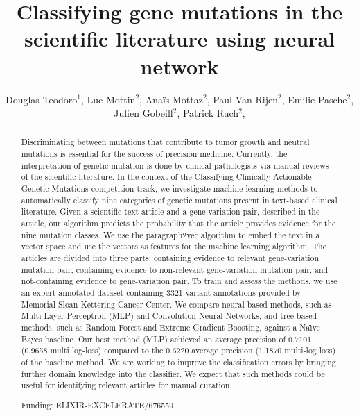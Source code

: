 \documentclass[twoside]{article}
\title{\vspace{-15mm}\fontsize{24pt}{10pt}\selectfont\textbf{ Classifying gene mutations in the scientific literature using neural network }} %
\author{ Douglas Teodoro$^{1}$, Luc Mottin$^{2}$, Anaïs Mottaz$^{2}$, Paul Van Rijen$^{2}$, Emilie Pasche$^{2}$, Julien Gobeill$^{2}$, Patrick Ruch$^{2}$, }
\affil{ 1 SIB Swiss Institute of Bioinformatics

2 HES-SO/HEG Geneva

 }
\date{}
\begin{document}
  
  
  \maketitle %
  
  
  \thispagestyle{fancy} %
  
  
  \begin{abstract}
  Discriminating between mutations that contribute to tumor growth and neutral mutations is essential for the success of precision medicine. Currently, the interpretation of genetic mutation is done by clinical pathologists via manual reviews of the scientific literature. In the context of the Classifying Clinically Actionable Genetic Mutations competition track, we investigate machine learning methods to automatically classify nine categories of genetic mutations present in text-based clinical literature. Given a scientific text article and a gene-variation pair, described in the article, our algorithm predicts the probability that the article provides evidence for the nine mutation classes. We use the paragraph2vec algorithm to embed the text in a vector space and use the vectors as features for the machine learning algorithm. The articles are divided into three parts: containing evidence to relevant gene-variation mutation pair, containing evidence to non-relevant gene-variation mutation pair, and not-containing evidence to gene-variation pair. To train and assess the methods, we use an expert-annotated dataset containing 3321 variant annotations provided by Memorial Sloan Kettering Cancer Center. We compare neural-based methods, such as Multi-Layer Perceptron (MLP) and Convolution Neural Networks, and tree-based methods, such as Random Forest and Extreme Gradient Boosting, against a Na\"{\i}ve Bayes baseline. Our best method (MLP) achieved an average precision of 0.7101 (0.9658 multi log-loss) compared to the 0.6220 average precision (1.1870 multi-log loss) of the baseline method. We are working to improve the classification errors by bringing further domain knowledge into the classifier. We expect that such methods could be useful for identifying relevant articles for manual curation.
  
  Funding: ELIXIR-EXCELERATE/676559 \\ 
  \end{abstract}
  
\end{document}
